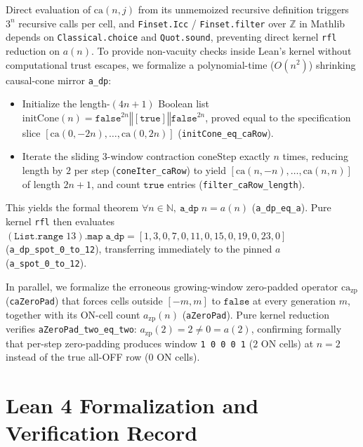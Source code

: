 \documentclass[11pt]{article}
\theoremstyle{definition}
\newcommand{\N}{\mathbb{N}}
\newcommand{\Z}{\mathbb{Z}}
\newcommand{\ca}{\mathrm{ca}}
\newcommand{\btrue}{\mathtt{true}}
\newcommand{\bfalse}{\mathtt{false}}
\begin{document}
Direct evaluation of $\ca(n, j)$ from its unmemoized recursive definition triggers $3^n$ recursive calls per cell, and \texttt{Finset.Icc} / \texttt{Finset.filter} over $\Z$ in Mathlib depends on \texttt{Classical.choice} and \texttt{Quot.sound}, preventing direct kernel \texttt{rfl} reduction on $a(n)$. To provide non-vacuity checks inside Lean's kernel without computational trust escapes, we formalize a polynomial-time ($O(n^2)$) shrinking causal-cone mirror \texttt{a\_dp}:
\begin{itemize}
\item Initialize the length-$(4n + 1)$ Boolean list $\mathrm{initCone}(n) = \bfalse^{2n} \mathbin{\Vert} [\btrue] \mathbin{\Vert} \bfalse^{2n}$, proved equal to the specification slice $[\ca(0, -2n), \dots, \ca(0, 2n)]$ (\texttt{initCone\_eq\_caRow}).
\item Iterate the sliding $3$-window contraction $\mathrm{coneStep}$ exactly $n$ times, reducing length by $2$ per step (\texttt{coneIter\_caRow}) to yield $[\ca(n, -n), \dots, \ca(n, n)]$ of length $2n + 1$, and count $\btrue$ entries (\texttt{filter\_caRow\_length}).
\end{itemize}
This yields the formal theorem $\forall n \in \N,\ \mathtt{a\_dp}\; n = a(n)$ (\texttt{a\_dp\_eq\_a}). Pure kernel \texttt{rfl} then evaluates $(\mathtt{List.range}\; 13).\mathtt{map}\; \mathtt{a\_dp} = [1, 3, 0, 7, 0, 11, 0, 15, 0, 19, 0, 23, 0]$ (\texttt{a\_dp\_spot\_0\_to\_12}), transferring immediately to the pinned $a$ (\texttt{a\_spot\_0\_to\_12}).

In parallel, we formalize the erroneous growing-window zero-padded operator $\ca_{\mathrm{zp}}$ (\texttt{caZeroPad}) that forces cells outside $[-m, m]$ to $\bfalse$ at every generation $m$, together with its ON-cell count $a_{\mathrm{zp}}(n)$ (\texttt{aZeroPad}). Pure kernel reduction verifies \texttt{aZeroPad\_two\_eq\_two}: $a_{\mathrm{zp}}(2) = 2 \ne 0 = a(2)$, confirming formally that per-step zero-padding produces window \texttt{1 0 0 0 1} ($2$ ON cells) at $n = 2$ instead of the true all-OFF row ($0$ ON cells).

\section{Lean 4 Formalization and Verification Record}
\end{document}
